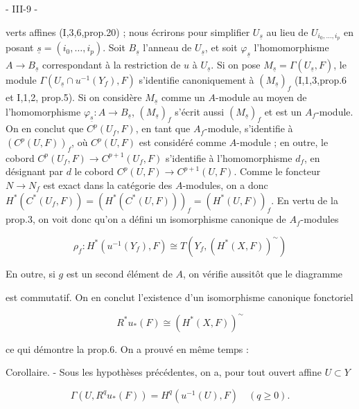 \newpage


- III-9 -

verts affines (I,3,6,prop.20) ; nous écrirons pour simplifier $U_{\underline{s}}$ au lieu de $U_{i_0, \dots, i_p}$ en posant $\underline{s} = (i_0, \dots, i_p)$. Soit $B_{\underline{s}}$ l'anneau de $U_{\underline{s}}$, et soit $\varphi_{\underline{s}}$ l'homomorphisme $A \to B_{\underline{s}}$ correspondant à la restriction de $u$ à $U_{\underline{s}}$. Si on pose $M_{\underline{s}} = \Gamma(U_{\underline{s}}, F)$, le module $\Gamma(U_{\underline{s}} \cap u^{-1}(Y_f), F)$ s'identifie canoniquement à $(M_{\underline{s}})_f$ (I,1,3,prop.6 et I,1,2, prop.5). Si on considère $M_{\underline{s}}$ comme un $A$-module au moyen de l'homomorphisme $\varphi_{\underline{s}} : A \to B_{\underline{s}}$, $(M_{\underline{s}})_f$ s'écrit aussi $(M_{\underline{s}})_f$ et est un $A_f$-module. On en conclut que $C^p(U_f, F)$, en tant que $A_f$-module, s'identifie à $(C^p(U, F))_f$, où $C^p(U, F)$ est considéré comme $A$-module ; en outre, le cobord $C^p(U_f, F) \to C^{p+1}(U_f, F)$ s'identifie à l'homomorphisme $d_f$, en désignant par $d$ le cobord $C^p(U, F) \to C^{p+1}(U, F)$. Comme le foncteur $N \to N_f$ est exact dans la catégorie des $A$-modules, on a donc $H^*(C^*(U_f, F)) = (H^*(C^*(U, F)))_f = (H^*(U, F))_f$. En vertu de la prop.3, on voit donc qu'on a défini un isomorphisme canonique de $A_f$-modules

$$\rho_f : H^*(u^{-1}(Y_f), F) \cong T(Y_f, (H^*(X, F))^{\sim})$$

En outre, si $g$ est un second élément de $A$, on vérifie aussitôt que le diagramme


est commutatif. On en conclut l'existence d'un isomorphisme canonique fonctoriel

$$R^*u_*(F) \cong (H^*(X, F))^{\sim}$$

ce qui démontre la prop.6. On a prouvé en même temps :

Corollaire. - Sous les hypothèses précédentes, on a, pour tout ouvert affine $U \subset Y$

$$\Gamma(U, R^q u_*(F)) = H^q(u^{-1}(U), F) \quad (q \ge 0).$$

